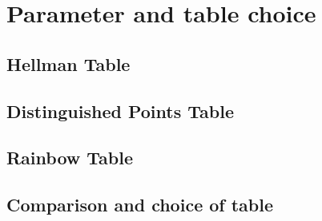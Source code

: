 \chapter{Parameter and table choice}

\section{Hellman Table}



\section{Distinguished Points Table}



\section{Rainbow Table}



\section{Comparison and choice of table}

